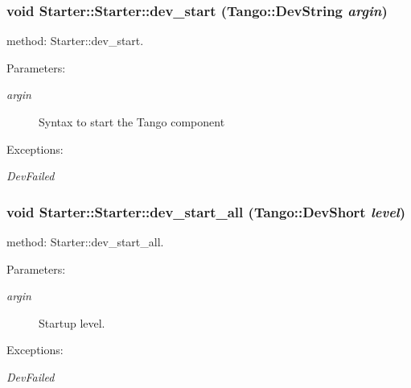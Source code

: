 \subsubsection{\setlength{\rightskip}{0pt plus 5cm}void Starter::Starter::dev\_\-start (Tango::Dev\-String {\em argin})}\label{classStarter_1_1Starter_z5_5}


method: Starter::dev\_\-start.

\begin{Desc}
\item[Parameters: ]\par
\begin{description}
\item[{\em 
argin}]Syntax to start the Tango component \end{description}
\end{Desc}
\begin{Desc}
\item[Exceptions: ]\par
\begin{description}
\item[{\em 
Dev\-Failed}] \end{description}
\end{Desc}
\subsubsection{\setlength{\rightskip}{0pt plus 5cm}void Starter::Starter::dev\_\-start\_\-all (Tango::Dev\-Short {\em level})}\label{classStarter_1_1Starter_z5_1}


method: Starter::dev\_\-start\_\-all.

\begin{Desc}
\item[Parameters: ]\par
\begin{description}
\item[{\em 
argin}]Startup level. \end{description}
\end{Desc}
\begin{Desc}
\item[Exceptions: ]\par
\begin{description}
\item[{\em 
Dev\-Failed}] \end{description}
\end{Desc}
